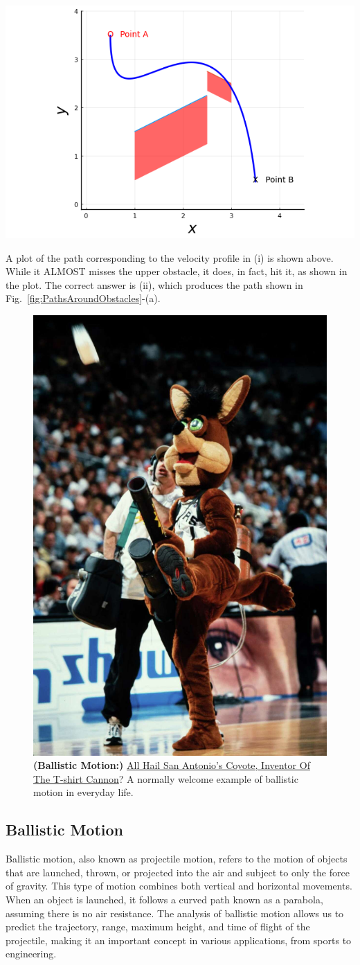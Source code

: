 \bigskip
\begin{center}
\includegraphics[width=0.5\columnwidth]{graphics/Chap03/IntegratedVelocityProfileR2Solutions_WrongPath.png}
\end{center}

\bigskip
A plot of the path corresponding to the velocity profile in (i) is shown above. While it ALMOST misses the upper obstacle, it does, in fact, hit it, as shown in the plot. The correct answer is (ii), which produces the path shown in Fig.~\ref{fig:PathsAroundObstacles}-(a).

\Qed


\begin{figure}[hbt]%
\centering
\includegraphics[width=0.3\columnwidth]{graphics/Chap03/tshirtCannon.jpg}
    \caption[]{\textbf{(Ballistic Motion:)} \href{https://sports.yahoo.com/blogs/nba-ball-dont-lie/hail-san-antonio-coyote-inventor-t-shirt-cannon-144630273.html?a20=1}{All Hail San Antonio's Coyote, Inventor Of The T-shirt Cannon}? A normally welcome example of ballistic motion in everyday life.}
    \label{fig:TshirtCannonBallisticMotion}
\end{figure}

\subsection{Ballistic Motion}

Ballistic motion, also known as projectile motion, refers to the motion of objects that are launched, thrown, or projected into the air and subject to only the force of gravity. This type of motion combines both vertical and horizontal movements. When an object is launched, it follows a curved path known as a parabola, assuming there is no air resistance. The analysis of ballistic motion allows us to predict the trajectory, range, maximum height, and time of flight of the projectile, making it an important concept in various applications, from sports to engineering. 


